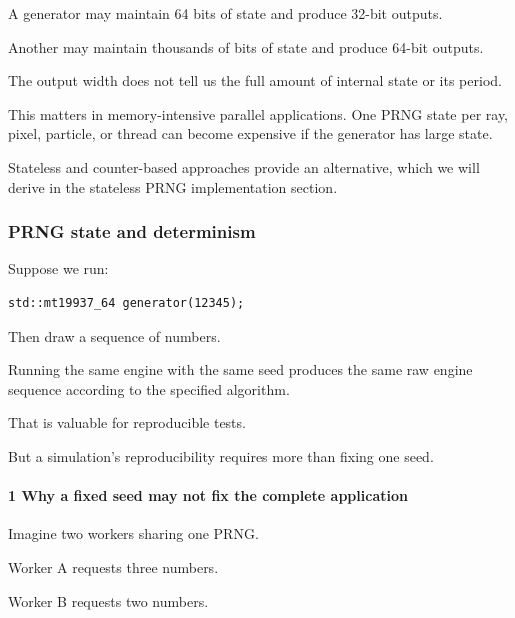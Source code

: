\hypertarget{02-foundations-ii-ch029-state-size-versus-output-size}{}

A generator may maintain 64 bits of state and produce 32-bit outputs.

Another may maintain thousands of bits of state and produce 64-bit outputs.

The output width does not tell us the full amount of internal state or its period.

This matters in memory-intensive parallel applications. One PRNG state per ray, pixel, particle, or thread can become expensive if the generator has large state.

Stateless and counter-based approaches provide an alternative, which we will derive in the stateless PRNG implementation section.

\subsubsection{PRNG state and determinism}\label{02-foundations-ii-ch029-prng-state-and-determinism}

\hypertarget{02-foundations-ii-ch029-prng-state-and-determinism}{}

Suppose we run:

\begin{verbatim}
std::mt19937_64 generator(12345);
\end{verbatim}

Then draw a sequence of numbers.

Running the same engine with the same seed produces the same raw engine sequence according to the specified algorithm.

That is valuable for reproducible tests.

But a simulation's reproducibility requires more than fixing one seed.

\paragraph{1 Why a fixed seed may not fix the complete application}\label{02-foundations-ii-ch029-why-a-fixed-seed-may-not-fix-the-complete-application}

\hypertarget{02-foundations-ii-ch029-why-a-fixed-seed-may-not-fix-the-complete-application}{}

Imagine two workers sharing one PRNG.

Worker A requests three numbers.

Worker B requests two numbers.

